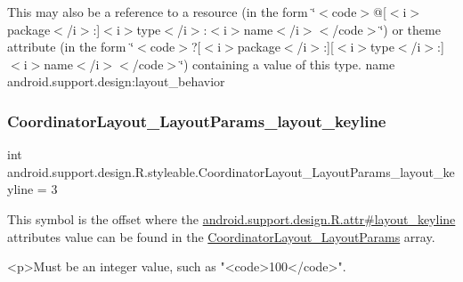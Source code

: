 This may also be a reference to a resource (in the form \char`\"{}$<$code$>$@\mbox{[}$<$i$>$package$<$/i$>$\+:\mbox{]}$<$i$>$type$<$/i$>$\+:$<$i$>$name$<$/i$>$$<$/code$>$\char`\"{}) or theme attribute (in the form \char`\"{}$<$code$>$?\mbox{[}$<$i$>$package$<$/i$>$\+:\mbox{]}\mbox{[}$<$i$>$type$<$/i$>$\+:\mbox{]}$<$i$>$name$<$/i$>$$<$/code$>$\char`\"{}) containing a value of this type.  name android.\+support.\+design\+:layout\+\_\+behavior \mbox{\label{classandroid_1_1support_1_1design_1_1R_1_1styleable_a4261fa2784dbde0962e2046fc2bbfb18}} 
\subsubsection{\texorpdfstring{Coordinator\+Layout\+\_\+\+Layout\+Params\+\_\+layout\+\_\+keyline}{CoordinatorLayout\_LayoutParams\_layout\_keyline}}
{\footnotesize\ttfamily int android.\+support.\+design.\+R.\+styleable.\+Coordinator\+Layout\+\_\+\+Layout\+Params\+\_\+layout\+\_\+keyline = 3\hspace{0.3cm}{\ttfamily [static]}}

This symbol is the offset where the \hyperlink{classandroid_1_1support_1_1design_1_1R_1_1attr_a8232f78f637dacb005523bdcf8264c99}{android.\+support.\+design.\+R.\+attr\#layout\+\_\+keyline} attribute\textquotesingle{}s value can be found in the \hyperlink{classandroid_1_1support_1_1design_1_1R_1_1styleable_a8dd236b417b377b73830c1c47c3b2490}{Coordinator\+Layout\+\_\+\+Layout\+Params} array.

\begin{DoxyVerb}      <p>Must be an integer value, such as "<code>100</code>".
\end{DoxyVerb}
 

